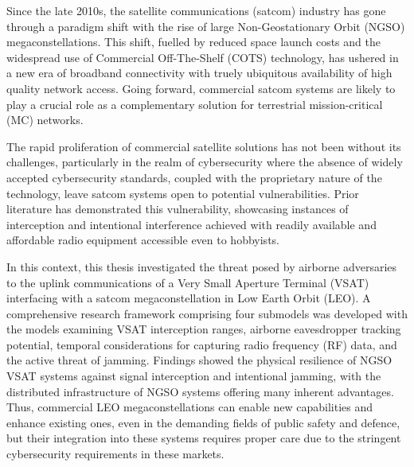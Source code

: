 \documentclass[english, 12pt, a4paper, elec, utf8, a-1b, online]{aaltothesis}
\date{31.12.2023}
\begin{document}
\makecoverpage

\makecopyrightpage


\begin{abstractpage}[english]
  Since the late 2010s, the satellite communications (satcom) industry has gone through a paradigm shift with the rise of large Non-Geostationary Orbit (NGSO) megaconstellations.
  This shift, fuelled by reduced space launch costs and the widespread use of Commercial Off-The-Shelf (COTS) technology, has ushered in a new era of broadband connectivity with truely ubiquitous availability of high quality network access.
  Going forward, commercial satcom systems are likely to play a crucial role as a complementary solution for terrestrial mission-critical (MC) networks.

  The rapid proliferation of commercial satellite solutions has not been without its challenges, particularly in the realm of cybersecurity where the absence of widely accepted cybersecurity standards, coupled with the proprietary nature of the technology, leave satcom systems open to potential vulnerabilities. Prior literature has demonstrated this vulnerability, showcasing instances of interception and intentional interference achieved with readily available and affordable radio equipment accessible even to hobbyists.

  In this context, this thesis investigated the threat posed by airborne adversaries to the uplink communications of a Very Small Aperture Terminal (VSAT) interfacing with a satcom megaconstellation in Low Earth Orbit (LEO). A comprehensive research framework comprising four submodels was developed with the models examining VSAT interception ranges, airborne eavesdropper tracking potential, temporal considerations for capturing radio frequency (RF) data, and the active threat of jamming. Findings showed the physical resilience of NGSO VSAT systems against signal interception and intentional jamming, with the distributed infrastructure of NGSO systems offering many inherent advantages. Thus, commercial LEO megaconstellations can enable new capabilities and enhance existing ones, even in the demanding fields of public safety and defence, but their integration into these systems requires proper care due to the stringent cybersecurity requirements in these markets.
\end{abstractpage}
\end{document}
